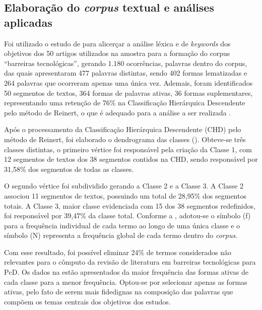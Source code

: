 \documentclass{textolivre}
\begin{document}
\subsection{Elaboração do \emph{corpus} textual e análises aplicadas}
Foi utilizado o estudo de \textcite{marchand2012} para alicerçar a análise léxica e de \emph{keywords} dos objetivos dos 50 artigos utilizados na amostra para a formação do corpus “barreiras tecnológicas”, gerando 1.180 ocorrências, palavras dentro do corpus, das quais apresentaram 477 palavras distintas, sendo 402 formas lematizadas e 264 palavras que ocorreram apenas uma única vez. Ademais, foram identificados 50 segmentos de textos, 364 formas de palavras ativas, 36 formas suplementares, representando uma retenção de 76\% na Classificação Hierárquica Descendente pelo método de Reinert, o que é adequado para a análise a ser realizada \cite{reinert1990}.

Após o processamento da Classificação Hierárquica Descendente (CHD) pelo método de Reinert, foi elaborado o dendrograma das classes (). Obteve-se três classes distintas, o primeiro vértice foi responsável pela criação da Classe 1, com 12 segmentos de textos dos 38 segmentos contidos na CHD, sendo responsável por 31,58\% dos segmentos de todas as classes.

O segundo vértice foi subdividido gerando a Classe 2 e a Classe 3. A Classe 2 associou 11 segmentos de textos, possuindo um total de 28,95\% dos segmentos totais. A Classe 3, maior classe evidenciada com 15 dos 38 segmentos redefinidos, foi responsável por 39,47\% da classe total. Conforme a , adotou-se o símbolo (f) para a frequência individual de cada termo ao longo de uma única classe e o símbolo (N) representa a frequência global de cada termo dentro do \emph{corpus}.

Com esse resultado, foi possível eliminar 24\% de termos considerados não relevantes para o cômputo da revisão de literatura em barreiras tecnológicas para PcD. Os dados na  estão apresentados da maior frequência das formas ativas de cada classe para a menor frequência. Optou-se por selecionar apenas as formas ativas, pelo fato de serem mais fidedignas na composição das palavras que compõem os temas centrais dos objetivos dos estudos.
\end{document}
